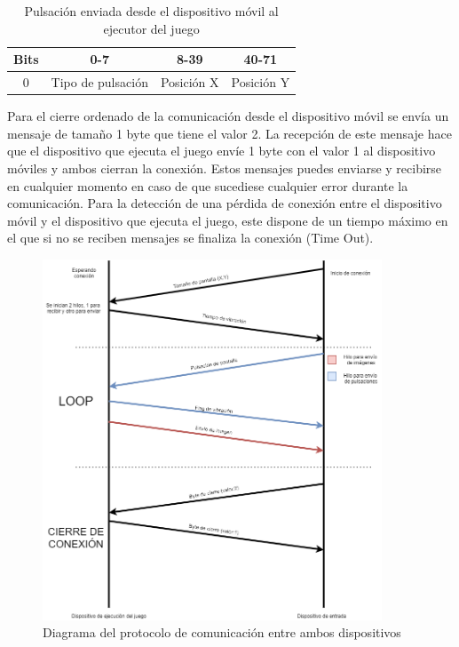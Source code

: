 \begin{table}[h!]
\centering
\begin{tabular}{|l|c|c|c|} 
\hline
Bits                    & 0-7               & 8-39                            & 40-71                            \\ 
\hline
\multicolumn{1}{|c|}{0} & Tipo de pulsaci\'on & \multicolumn{1}{l|}{Posici\'on X} & \multicolumn{1}{l|}{Posici\'on Y}  \\
\hline
\end{tabular}
\caption{Pulsaci\'on enviada desde el dispositivo m\'ovil al ejecutor del juego}
\label{table:2}
\end{table}

Para el cierre ordenado de la comunicaci\'on desde el dispositivo m\'ovil se env\'ia un mensaje de tama\~no 1 byte que tiene el valor 2. La recepci\'on de este mensaje hace que el dispositivo que ejecuta el juego env\'ie 1 byte con el valor 1 al dispositivo m\'oviles y ambos cierran la conexi\'on. Estos mensajes puedes enviarse y recibirse en cualquier momento en caso de que sucediese cualquier error durante la comunicaci\'on. Para la detecci\'on de una p\'erdida de conexi\'on entre el dispositivo m\'ovil y el dispositivo que ejecuta el juego, este dispone de un tiempo m\'aximo en el que si no se reciben mensajes se finaliza la conexi\'on (Time Out).

\begin{figure}[h]

\centering
\includegraphics[width=0.9\textwidth]{./Imagenes/Bitmap/Arquitectura}
\caption{Diagrama del protocolo de comunicaci\'on entre ambos dispositivos}
\end{figure}



